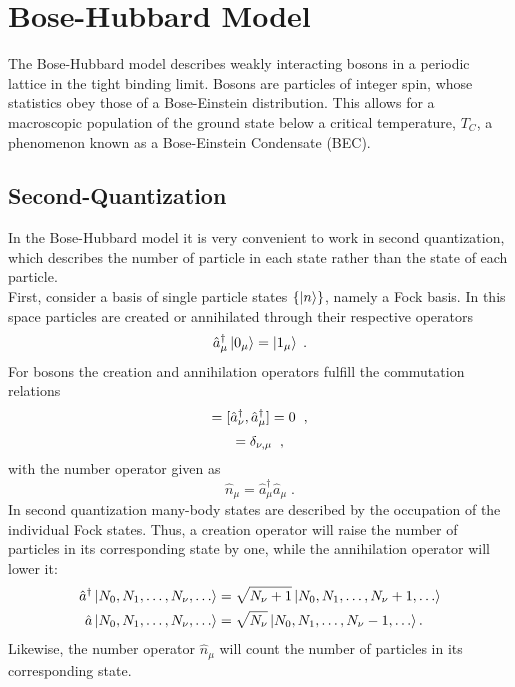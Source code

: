 \chapter{Bose-Hubbard Model}
The Bose-Hubbard model describes weakly interacting bosons in a periodic lattice in the tight binding limit. Bosons are particles of integer spin, whose statistics obey those of a Bose-Einstein distribution. This allows for a macroscopic population of the ground state below a critical temperature, $T_C$, a phenomenon known as a Bose-Einstein Condensate (BEC). 

\section{Second-Quantization}
In the Bose-Hubbard model it is very convenient to work in second quantization, which describes the number of particle in each state rather than the state of each particle.\\
First, consider a basis of single particle states $\{ \ket{n} \}$, namely a Fock basis. In this space particles are created or annihilated through their respective operators
\begin{equation}
	\hat{a}_{\mu}^{\dag} \ket{0_\mu} = \ket{1_\mu} \; .
\end{equation}
For bosons the creation and annihilation operators fulfill the commutation relations
\begin{equation}
[\hat{a}_\nu,\hat{a}_\mu]=[\hat{a}_\nu^\dagger,\hat{a}_\mu^\dagger]=0 \hspace{0.2cm},  \label{eq:com_a_0}
\end{equation}
%
\begin{equation}
[\hat{a}_\nu,\hat{a}_\mu^\dagger]=\delta_{\nu,\mu} \hspace{0.2cm} ,\label{eq:com_a_1}
\end{equation}
with the number operator given as
\begin{equation}
	\hat{n}_{\mu} = \hat{a}_{\mu}^{\dag} \hat{a}_{\mu} \; .
\end{equation}
In second quantization many-body states are described by the occupation of the individual Fock states. Thus, a creation operator will raise the number of particles in its corresponding state by one, while the annihilation operator will lower it:
\begin{align}
\hat{a}^\dagger \ket{N_0,N_1, \ldots , N_{\nu},\ldots}&= \sqrt{N_\nu+1}\ket{N_0,N_1, \ldots , N_{\nu}+1,\ldots} \\
\hat{a} \ket{N_0,N_1, \ldots , N_{\nu},\ldots}&= \sqrt{N_\nu}\ket{N_0,N_1, \ldots , N_{\nu}-1,\ldots} .
\end{align}Likewise, the number operator $\hat{n}_{\mu}$ will count the number of particles in its corresponding state.\\
